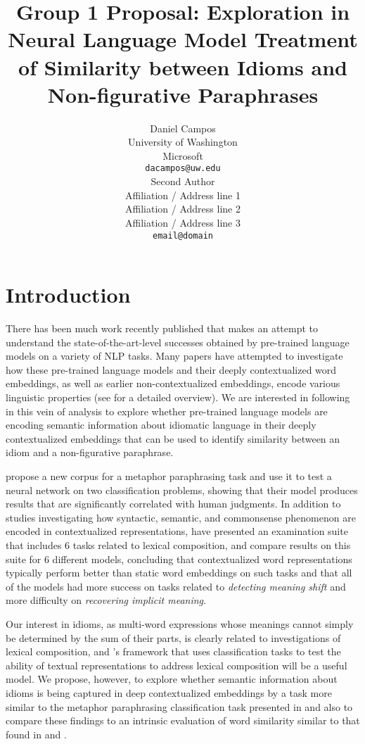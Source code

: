 \documentclass[11pt,a4paper]{article}
\title{Group 1 Proposal: Exploration in  Neural Language Model Treatment of Similarity between Idioms and Non-figurative Paraphrases}
\author{Daniel Campos \\
  University of Washington  \\
  Microsoft \\
  \texttt{dacampos@uw.edu} \\\And
  Second Author \\
  Affiliation / Address line 1 \\
  Affiliation / Address line 2 \\
  Affiliation / Address line 3 \\
  \texttt{email@domain} \\}
\date{}
\begin{document}
\maketitle
\section{Introduction}
There has been much work recently published that makes an attempt to understand the state-of-the-art-level successes obtained by pre-trained language models on a variety of NLP tasks. Many papers have attempted to investigate how these pre-trained language models and their deeply contextualized word embeddings, as well as earlier non-contextualized embeddings, encode various linguistic properties (see \citet{Belinkov_2019} for a detailed overview). We are interested in following in this vein of analysis to explore whether pre-trained language models are encoding semantic information about idiomatic language in their deeply contextualized embeddings that can be used to identify similarity between an idiom and a non-figurative paraphrase.

\citet{bizzoni-lappin-2018-predicting} propose a new corpus for a metaphor paraphrasing task and use it to test a neural network on two classification problems, showing that their model produces results that are significantly correlated with human judgments. In addition to studies investigating how syntactic, semantic, and commonsense \citep{zhou2019evaluating} phenomenon are encoded in contextualized representations, \citet{shwartz2019pain} have presented an examination suite that includes 6 tasks related to lexical composition, and compare results on this suite for 6 different models, concluding that contextualized word representations typically perform better than static word embeddings on such tasks and that all of the models had more success on tasks related to \textit{detecting meaning shift} and more difficulty on \textit{recovering implicit meaning}. 

Our interest in idioms, as multi-word expressions whose meanings cannot simply be determined by the sum of their parts, is clearly related to investigations of lexical composition, and \citet{shwartz2019pain}'s framework that uses classification tasks to test the ability of textual representations to address lexical composition will be a useful model. We propose, however, to explore whether semantic information about idioms is being captured in deep contextualized embeddings by a task more similar to the metaphor paraphrasing classification task presented in \citet{bizzoni-lappin-2018-predicting} and also to compare these findings to an intrinsic evaluation of word similarity similar to that found in \citet{Wang_2019} and \citet{van_Aken_2019}.
\end{document}
